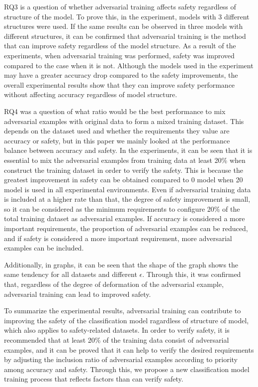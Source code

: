 \documentclass[journal,article,submit,moreauthors,pdftex]{Definitions/mdpi}
\begin{document}
RQ3 is a question of whether adversarial training affects safety regardless of structure of the model.
To prove this, in the experiment, models with 3 different structures were used.
If the same results can be observed in three models with different structures, it can be confirmed that adversarial training is the method that can improve safety regardless of the model structure.
As a result of the experiments, when adversarial training was performed, safety was improved compared to the case when it is not.
Although the models used in the experiment may have a greater accuracy drop compared to the safety improvements, the overall experimental results show that they can improve safety performance without affecting accuracy regardless of model structure.

RQ4 was a question of what ratio would be the best performance to mix adversarial examples with original data to form a mixed training dataset.
This depends on the dataset used and whether the requirements they value are accuracy or safety, but in this paper we mainly looked at the performance balance between accuracy and safety.
In the experiments, it can be seen that it is essential to mix the adversarial examples from training data at least 20\% when construct the training dataset in order to verify the safety.
This is because the greatest improvement in safety can be obtained compared to 0 model when 20 model is used in all experimental environments.
Even if adversarial training data is included at a higher rate than that, the degree of safety improvement is small, so it can be considered as the minimum requirements to configure 20\% of the total training dataset as adversarial examples.
If accuracy is considered a more important requirements, the proportion of adversarial examples can be reduced, and if safety is considered a more important requirement, more adversarial examples can be included.

Additionally, in graphs, it can be seen that the shape of the graph shows the same tendency for all datasets and different \begin{math}\epsilon\end{math}.
Through this, it was confirmed that, regardless of the degree of deformation of the adversarial example, adversarial training can lead to improved safety.

To summarize the experimental results, adversarial training can contribute to improving the safety of the classification model ragardless of structure of model, which also applies to safety-related datasets.
In order to verify safety, it is recommended that at least 20\% of the training data consist of adversarial examples, and it can be proved that it can help to verify the desired requirements by adjusting the inclusion ratio of adversarial examples according to priority among accuracy and safety.
Through this, we propose a new classification model training process that reflects factors than can verify safety.
\end{document}
